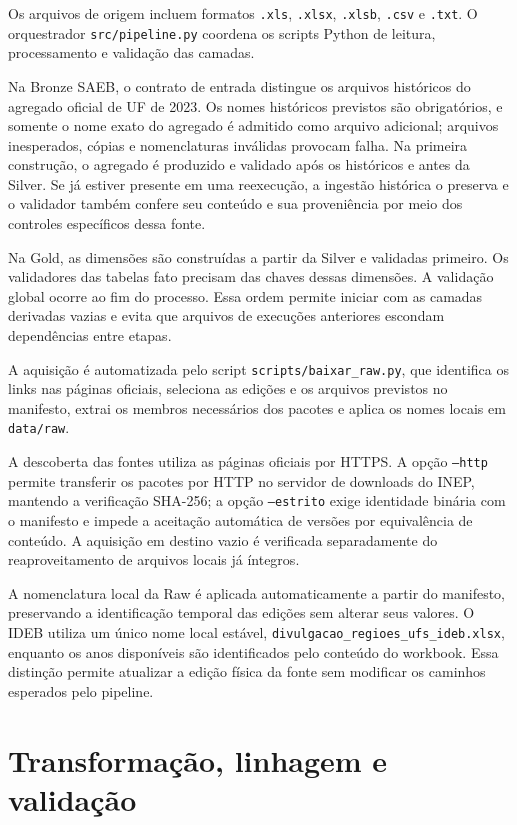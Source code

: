 Os arquivos de origem incluem formatos \texttt{.xls}, \texttt{.xlsx}, \texttt{.xlsb}, \texttt{.csv} e \texttt{.txt}. O orquestrador \texttt{src/pipeline.py} coordena os scripts Python de leitura, processamento e validação das camadas.

Na Bronze SAEB, o contrato de entrada distingue os arquivos históricos do agregado oficial de UF de 2023. Os nomes históricos previstos são obrigatórios, e somente o nome exato do agregado é admitido como arquivo adicional; arquivos inesperados, cópias e nomenclaturas inválidas provocam falha. Na primeira construção, o agregado é produzido e validado após os históricos e antes da Silver. Se já estiver presente em uma reexecução, a ingestão histórica o preserva e o validador também confere seu conteúdo e sua proveniência por meio dos controles específicos dessa fonte.

Na Gold, as dimensões são construídas a partir da Silver e validadas primeiro. Os validadores das tabelas fato precisam das chaves dessas dimensões. A validação global ocorre ao fim do processo. Essa ordem permite iniciar com as camadas derivadas vazias e evita que arquivos de execuções anteriores escondam dependências entre etapas.

A aquisição é automatizada pelo script \texttt{scripts/baixar\_raw.py}, que identifica os links nas páginas oficiais, seleciona as edições e os arquivos previstos no manifesto, extrai os membros necessários dos pacotes e aplica os nomes locais em \texttt{data/raw}.

A descoberta das fontes utiliza as páginas oficiais por HTTPS. A opção \texttt{--http} permite transferir os pacotes por HTTP no servidor de downloads do INEP, mantendo a verificação SHA-256; a opção \texttt{--estrito} exige identidade binária com o manifesto e impede a aceitação automática de versões por equivalência de conteúdo. A aquisição em destino vazio é verificada separadamente do reaproveitamento de arquivos locais já íntegros.

A nomenclatura local da Raw é aplicada automaticamente a partir do manifesto, preservando a identificação temporal das edições sem alterar seus valores. O IDEB utiliza um único nome local estável, \texttt{divulgacao\_regioes\_ufs\_ideb.xlsx}, enquanto os anos disponíveis são identificados pelo conteúdo do workbook. Essa distinção permite atualizar a edição física da fonte sem modificar os caminhos esperados pelo pipeline.

\section{Transformação, linhagem e validação}


